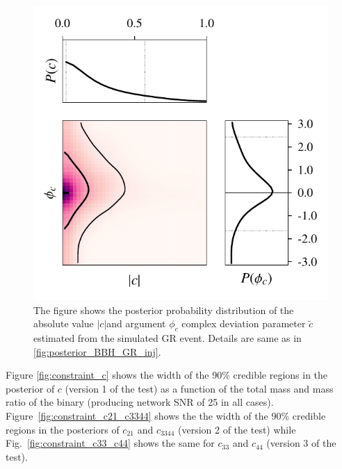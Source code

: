 \documentclass[prd,preprintnumbers,twocolumn,eqsecnum,floatfix,a4paper,nofootinbib,superscriptaddress]{revtex4}
\begin{document}
 \begin{figure}[tbh]
 	\begin{center}
 		\includegraphics[scale=0.8]{figs/M_80_q_9_SNR_25_complex_c1.pdf}
 	\end{center} 
 	\caption{The figure shows the posterior probability distribution of the absolute value $|c|$and argument $\phi_c$ complex deviation parameter $\tilde{c}$ estimated from the simulated GR event. Details are same as in \ref{fig:posterior_BBH_GR_inj}.}
 	\label{fig:c1_complex}
 \end{figure}
 


Figure \ref{fig:constraint_c} shows the width of the 90\% credible regions in the posterior of $c$  (version 1 of the test) as a function of the total mass and mass ratio of the binary (producing network SNR of 25 in all cases). Figure~\ref{fig:constraint_c21_c3344} shows the the width of the 90\% credible regions in the posteriors of $c_{21}$ and  $c_{3344}$  (version 2 of the test) while Fig.~\ref{fig:constraint_c33_c44} shows the same for $c_{33}$ and  $c_{44}$  (version 3 of the test). 
\end{document}
